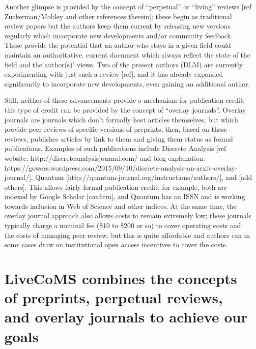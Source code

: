 \documentclass[9pt]{livecoms}
\begin{document}
Another glimpse is provided by the concept of ``perpetual'' or ``living'' reviews [ref Zuckerman/Mobley and other references therein]; these begin as traditional review papers but the authors keep them current by releasing new versions regularly which incorporate new developments and/or community feedback.
These provide the potential that an author who stays in a given field could maintain an authoritative, current document which always reflect the state of the field and the author(s)' views. 
Two of the present authors (DLM) are currently experimenting with just such a review [ref], and it has already expanded significantly to incorporate new developments, even gaining an additional author.

Still, neither of these advancements provide a mechanism for publication credit; this type of credit can be provided by the concept of ``overlay journals''.
Overlay journals are journals which don't formally host articles themselves, but which provide peer reviews of specific versions of preprints, then, based on these reviews, publishes articles by link to them and giving them status as formal publications.
Examples of such publications include Discrete Analysis [ref website: http://discreteanalysisjournal.com/ and blog explanation: https://gowers.wordpress.com/2015/09/10/discrete-analysis-an-arxiv-overlay-journal/], Quantum [http://quantum-journal.org/instructions/authors/], and  [add others].
This allows fairly formal publication credit; for example, both are indexed by Google Scholar [confirm], and Quantum has an ISSN and is working towards inclusion in Web of Science and other indices. 
At the same time, the overlay journal approach also allows costs to remain extremely low; these journals typically charge a nominal fee (\$10 to \$200 or so) to cover operating costs and the costs of managing peer review, but this is quite affordable and authors can in some cases draw on institutional open access incentives to cover the costs. 

\section{LiveCoMS combines the concepts of preprints, perpetual reviews, and overlay journals to achieve our goals}
\end{document}
